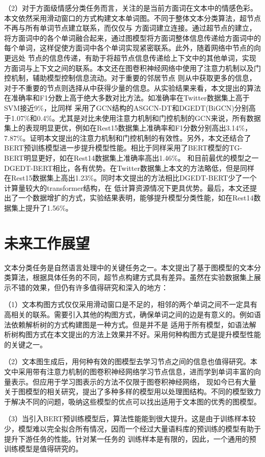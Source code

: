 （2）对于方面级情感分类任务而言，关注的是当前方面词在文本中的情感色彩。本文依然采用滑动窗口的方式构建文本单词图。不同于整体文本分类算法，超节点不再与所有单词节点建立联系，而仅仅与
方面词建立连接。通过超节点的建立，将方面词中的各个单词融合起来，通过图模型将方面词整体信息传递给方面词中的每个单词，这样促使方面词中各个单词实现紧密联系。此外，随着网络中节点的向更远处
节点的信息传递，有助于将超节点信息传递给上下文中的其他单词，实现方面词与上下文之间的联系。本文还在图卷积神经网络中使用了注意力机制以及门控机制，辅助模型控制信息流动。对于重要的邻居节点
则从中获取更多的信息，对于不重要的节点则选择从中获得少量的信息。从实验结果来看，本文提出的算法在准确率和F1分数上高于绝大多数对比方法。如准确率在Twitter数据集上高于SVM接近9\%，比同样
采用了GCN结构的ASGCN-DT和DGEDT(BiGCN)分别高于1.07\%和0.4\%。尤其是对比未使用注意力机制和门控机制的GCN来说，所有数据集上的表现明显更优，例如在Rest15数据集上准确率和F1分数分别高出3.14\%，
7.87\%。证明本文提出的注意力机制和门控机制的有效性。另外，本文还结合了BERT预训练模型进一步提升模型性能。相比于同样采用了BERT模型的TG-BERT明显更好，如在Rest14数据集上准确率高出1.46\%。
和目前最优的模型之一DGEDT-BERT相比，各有优势。在Twitter数据集上本文的方法略低，但是同样在Rest15数据集上高出1.23\%。同时本文提出的方法相比DGEDT-BERT少了一个计算量较大的transformer结构，在
低计算资源情况下更具优势。最后，本文还提出了一个数据增扩的方式，实验结果表明，能够提升模型分类性能，如在Rest14数据集上提升了1.56\%。

\section{未来工作展望}
文本分类任务是自然语言处理中的关键任务之一。本文提出了基于图模型的文本分类算法，根据具体任务的不同，超节点构建方式具有差异。虽然在实验数据集上展示不错的效果，但仍有许多值得研究和深入的地方：

（1）文本构图方式仅仅采用滑动窗口是不足的，相邻的两个单词之间不一定具有高相关的联系。需要引入其他的构图方式，确保单词之间的边是有意义的。例如语法依赖解析树的方式构建图是一种方式。但是并不是
适用于所有模型，如语法解析树构图方式在本文提出的方法上效果并不好。采用何种构图方式是提升模型性能的关键之一。

（2）文本图生成后，用何种有效的图模型去学习节点之间的信息也值得研究。本文中采用带有注意力机制的图卷积神经网络学习节点信息，进而学到单词丰富的向量表示。但应用于学习图表示的方法不仅限于图卷积神经网络，
现如今已有大量关于图模型的相关研究，提出了多种多样的模型用以处理图结构。不同的模型致力于解决不同的问题，吸纳这些模型的优点可以找出适用于文本图的优秀的图模型。

（3）当引入BERT预训练模型后，算法性能能到很大提升。这是由于训练样本较少，模型难以完全拟合所有情况，因而一个经过大量语料库的预训练的模型有助于提升下游任务的性能。针对某一任务的
训练样本是有限的，因此，一个通用的预训练模型是值得研究的。


